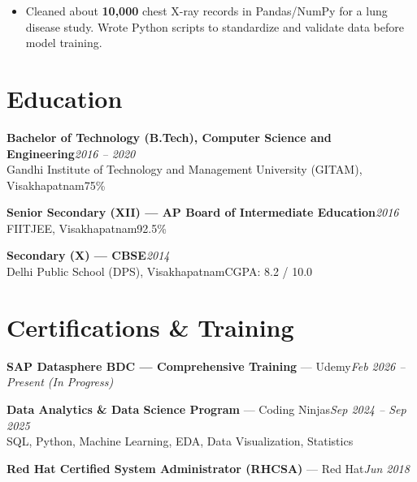 \documentclass[10pt, letterpaper]{article}
\begin{document}
\begin{itemize}
  \item Cleaned about \textbf{10,000} chest X-ray records in Pandas/NumPy for a lung disease study. Wrote Python scripts to standardize and validate data before model training.
\end{itemize}

\section{Education}

{\bfseries Bachelor of Technology (B.Tech), Computer Science and Engineering}\hfill{\small\color{muted}\textit{2016 -- 2020}}\\
{\small\color{muted}Gandhi Institute of Technology and Management University (GITAM), Visakhapatnam\hfill 75\%}

\vspace{2pt}
{\bfseries Senior Secondary (XII) --- AP Board of Intermediate Education}\hfill{\small\color{muted}\textit{2016}}\\
{\small\color{muted}FIITJEE, Visakhapatnam\hfill 92.5\%}

\vspace{2pt}
{\bfseries Secondary (X) --- CBSE}\hfill{\small\color{muted}\textit{2014}}\\
{\small\color{muted}Delhi Public School (DPS), Visakhapatnam\hfill CGPA: 8.2 / 10.0}

\section{Certifications \& Training}

{\bfseries SAP Datasphere BDC --- Comprehensive Training} --- Udemy\hfill{\small\color{muted}\textit{Feb 2026 -- Present \emph{(In Progress)}}}

\vspace{1pt}
{\bfseries Data Analytics \& Data Science Program} --- Coding Ninjas\hfill{\small\color{muted}\textit{Sep 2024 -- Sep 2025}}\\
{\small\color{muted}SQL, Python, Machine Learning, EDA, Data Visualization, Statistics}

\vspace{1pt}
{\bfseries Red Hat Certified System Administrator (RHCSA)} --- Red Hat\hfill{\small\color{muted}\textit{Jun 2018}}

\end{document}
